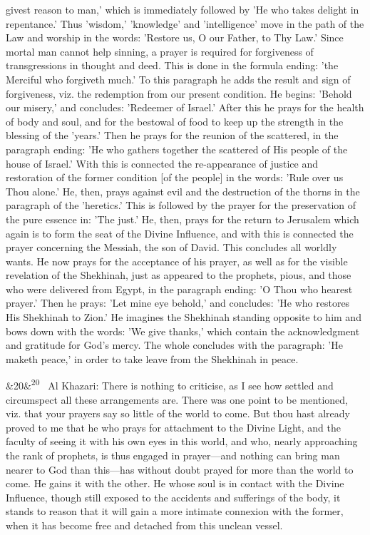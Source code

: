 \documentclass[12pt]{article}
\newcommand{\para}[1][]{\par\noindent\ifx&#1&\else\textsuperscript{\footnotesize #1}~\fi}
\begin{document}
givest reason to man,' which is immediately followed by 'He who takes delight in repentance.' Thus 'wisdom,' 'knowledge' and 'intelligence' move in the path of the Law and worship in the words: 'Restore us, O our Father, to Thy Law.' Since mortal man cannot help sinning, a prayer is required for forgiveness of transgressions in thought and deed. This is done in the formula ending: 'the Merciful who forgiveth much.' To this paragraph he adds the result and sign of forgiveness, viz. the redemption from our present condition. He begins: 'Behold our misery,' and concludes: 'Redeemer of Israel.' After this he prays for the health of body and soul, and for the bestowal of food to keep up the strength in the blessing of the 'years.' Then he prays for the reunion of the scattered, in the paragraph ending: 'He who gathers together the scattered of His people of the house of Israel.' With this is connected the re-appearance of justice and restoration of the former condition [of the people] in the words: 'Rule over us Thou alone.' He, then, prays against evil and the destruction of the thorns in the paragraph of the 'heretics.' This is followed by the prayer for the preservation of the pure essence in: 'The just.' He, then, prays for the return to Jerusalem which again is to form the seat of the Divine Influence, and with this is connected the prayer concerning the Messiah, the son of David. This concludes all worldly wants. He now prays for the acceptance of his prayer, as well as for the visible revelation of the Shekhinah, just as appeared to the prophets, pious, and those who were delivered from Egypt, in the paragraph ending: 'O Thou who hearest prayer.' Then he prays: 'Let mine eye behold,' and concludes: 'He who restores His Shekhinah to Zion.' He imagines the Shekhinah standing opposite to him and bows down with the words: 'We give thanks,' which contain the acknowledgment and gratitude for God's mercy. The whole concludes with the paragraph: 'He maketh peace,' in order to take leave from the Shekhinah in peace.

\para[20] Al Khazari: There is nothing to criticise, as I see how settled and circumspect all these arrangements are. There was one point to be mentioned, viz. that your prayers say so little of the world to come. But thou hast already proved to me that he who prays for attachment to the Divine Light, and the faculty of seeing it with his own eyes in this world, and who, nearly approaching the rank of prophets, is thus engaged in prayer---and nothing can bring man nearer to God than this---has without doubt prayed for more than the world to come. He gains it with the other. He whose soul is in contact with the Divine Influence, though still exposed to the accidents and sufferings of the body, it stands to reason that it will gain a more intimate connexion with the former, when it has become free and detached from this unclean vessel.
\end{document}
